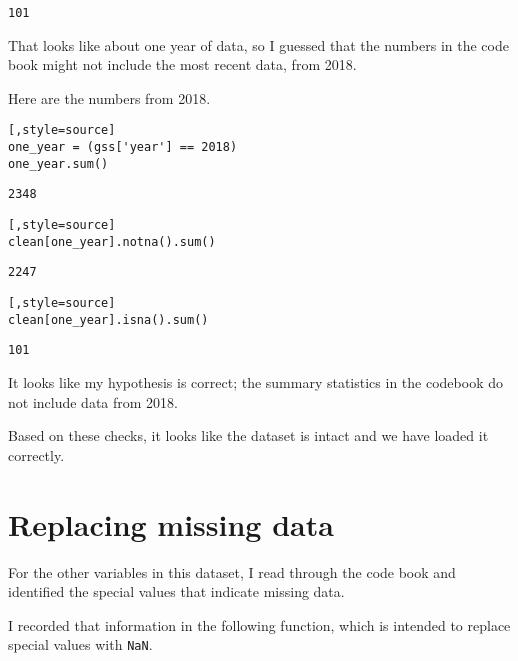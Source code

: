 \begin{lstlisting}[style=output]
101
\end{lstlisting}

That looks like about one year of data, so I guessed that the numbers in
the code book might not include the most recent data, from 2018.

Here are the numbers from 2018.

\begin{lstlisting}[,style=source]
one_year = (gss['year'] == 2018)
one_year.sum()
\end{lstlisting}

\begin{lstlisting}[style=output]
2348
\end{lstlisting}

\begin{lstlisting}[,style=source]
clean[one_year].notna().sum()
\end{lstlisting}

\begin{lstlisting}[style=output]
2247
\end{lstlisting}

\begin{lstlisting}[,style=source]
clean[one_year].isna().sum()
\end{lstlisting}

\begin{lstlisting}[style=output]
101
\end{lstlisting}

It looks like my hypothesis is correct; the summary statistics in the
codebook do not include data from 2018.

Based on these checks, it looks like the dataset is intact and we have
loaded it correctly.

\hypertarget{replacing-missing-data}{%
\section{Replacing missing data}\label{replacing-missing-data}}

For the other variables in this dataset, I read through the code book
and identified the special values that indicate missing data.

I recorded that information in the following function, which is intended
to replace special values with \passthrough{\lstinline!NaN!}.

